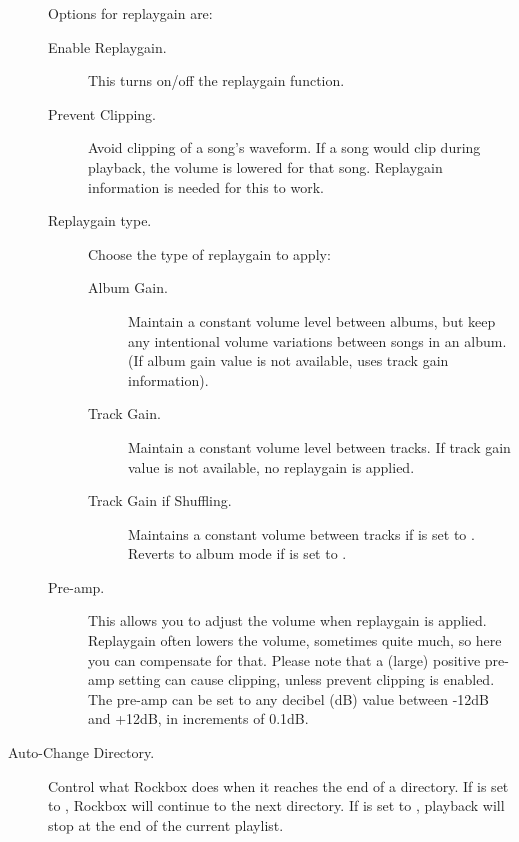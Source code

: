 \begin{description}
{      Options for replaygain are:
      \begin{description}
      \item[Enable Replaygain. ]This turns on/off the replaygain function.
      \item[Prevent Clipping. ]Avoid clipping of a song's waveform.
        If a song would clip during playback, the volume is lowered for 
        that song. Replaygain information is needed for this to work.
      \item[Replaygain type. ]Choose the type of replaygain to apply:
        \begin{description}
        \item[Album Gain. ]Maintain a constant volume level between
          albums, but keep any intentional volume variations between 
          songs in an album. (If album gain value is not available,
          uses track gain information).
        \item[Track Gain. ]Maintain a constant volume level between
          tracks. If track gain value is not available, no replaygain 
          is applied.
        \item[Track Gain if Shuffling. ]Maintains a constant volume
          between tracks if  is set to .
          Reverts to album mode if  is set to .
        \end{description}
      \item[Pre-amp. ]This allows you to adjust the volume when replaygain
        is applied. Replaygain often lowers the volume, sometimes quite
        much, so here you can compensate for that. Please note that a
        (large) positive pre-amp setting can cause clipping, unless
        prevent clipping is enabled.  The pre-amp can be set to any
        decibel (dB) value between -12dB and +12dB, in increments of 0.1{}dB.
      \end{description}
    }

\item[Auto-Change Directory. ]Control what Rockbox does when it reaches the end
  of a directory. If  is set to ,
  Rockbox will continue to the next directory. If
   is set to , playback will stop at
  the end of the current playlist.


\end{description}
